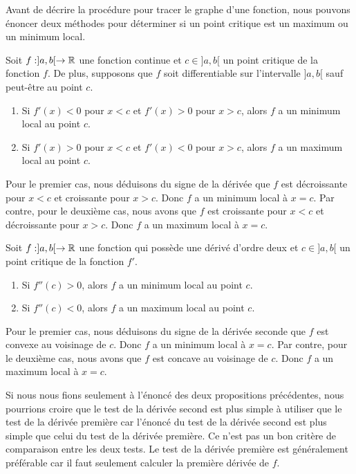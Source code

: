 {Avant de décrire la procédure pour tracer le graphe d'une fonction,
nous pouvons énoncer deux méthodes pour déterminer si un point critique est
un maximum ou un minimum local.

\begin{prop}
Soit $f:]a,b[ \to \mathbb{R}$ une fonction continue et $c \in ]a,b[$ un
point critique de la fonction $f$.  De plus, supposons que $f$ soit
differentiable sur l'intervalle $]a,b[$ sauf peut-être au point $c$.
\begin{enumerate}
\item Si $f'(x) < 0$ pour $x < c$ et $f'(x) > 0$ pour $x>c$, alors $f$
  a un minimum local au point $c$.
\item Si $f'(x) > 0$ pour $x < c$ et $f'(x) < 0$ pour $x>c$, alors $f$
  a un maximum local au point $c$.
\end{enumerate}
\label{Test2ndder}
\end{prop}

Pour le premier cas, nous déduisons du signe de la dérivée que $f$ est
décroissante pour $x < c$ et croissante pour $x > c$.  Donc $f$ a un
minimum local à $x = c$.  Par contre, pour le deuxième cas,
nous avons que $f$ est croissante pour $x < c$ et décroissante pour $x > c$.
Donc $f$ a un maximum local à $x = c$.

\begin{prop}
Soit $f:]a,b[ \to \mathbb{R}$ une fonction qui possède une dérivé d'ordre
deux et $c \in ]a,b[$ un point critique de la fonction $f'$.
\begin{enumerate}
\item Si $f''(c) > 0$, alors $f$ a un minimum local au point $c$.
\item Si $f''(c) < 0$, alors $f$ a un maximum local au point $c$.
\end{enumerate}
\end{prop}

Pour le premier cas, nous déduisons du signe de la dérivée seconde que $f$
est convexe au voisinage de $c$.  Donc $f$ a un minimum local à $x = c$.
Par contre, pour le deuxième cas, nous avons que $f$ est concave au
voisinage de $c$.  Donc $f$ a un maximum local à $x = c$. 

Si nous nous fions seulement à l'énoncé des deux propositions précédentes,
nous pourrions croire que le test de la dérivée second est plus simple à
utiliser que le test de la dérivée première car l'énoncé du test de la
dérivée second est plus simple que celui du test de la dérivée
première.  Ce n'est pas un bon critère de comparaison entre les deux
tests.  Le test de la dérivée première est généralement préférable car
il faut seulement calculer la première dérivée de $f$.

}
